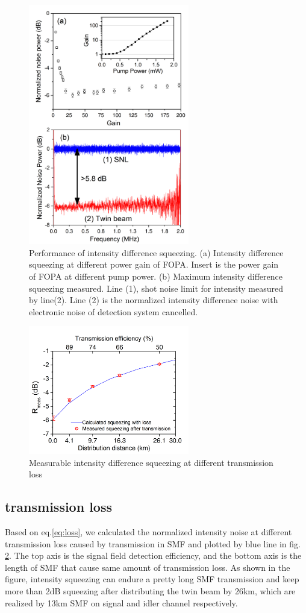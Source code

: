 \documentclass[9pt,twocolumn,twoside]{osajnl}
\begin{document}
\begin{figure}[htbp]
\centering
\includegraphics[width=7cm]{Gain_and_sqz_vertical_EN_cor.jpg}%
\caption{Performance of intensity difference squeezing. (a) Intensity difference squeezing at different power gain of FOPA. Insert is the  power gain of FOPA at different pump power. (b) Maximum intensity difference squeezing measured. Line (1), shot noise limit for intensity measured by line(2). Line (2) is the normalized intensity difference noise with electronic noise of detection system cancelled.}
\label{fig2_OPA}
\end{figure}

\begin{figure}[htbp]
\centering
\includegraphics[width=7cm]{Sqz_vs_Length_dB_color.jpg}
\caption{Measurable intensity difference squeezing at different transmission loss}
\label{fig_loss}
\end{figure}
\subsection{transmission loss}
Based on eq.\ref{eq:loss}, we calculated the normalized intensity noise at different transmission loss caused by transmission in SMF and plotted by blue line in fig. \ref{fig_loss}. The top axis is the signal field detection efficiency, and the bottom axis is the length of SMF that cause same amount of transmission loss. As shown in the figure, intensity squeezing can endure a pretty long SMF transmission and keep more than 2dB squeezing after distributing the twin beam by 26km, which are realized by 13km SMF on signal and idler channel respectively.
\end{document}
